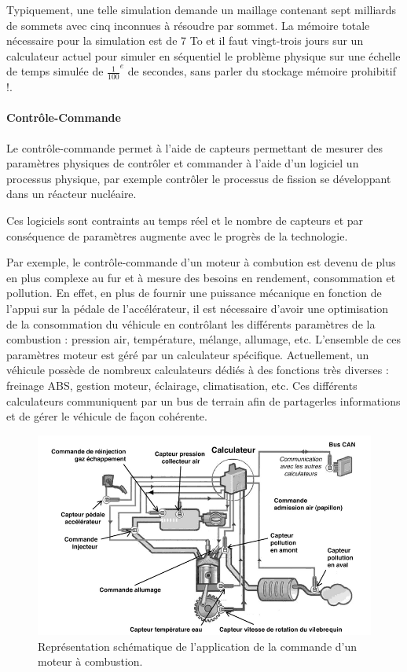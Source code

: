 \documentclass[fleqn,11pt]{article}
\begin{document}
Typiquement, une telle simulation demande un maillage contenant sept milliards de sommets avec cinq inconnues à résoudre par sommet. La mémoire totale nécessaire pour la simulation est de 7 To et il faut vingt-trois jours sur un calculateur actuel pour simuler en séquentiel le problème physique sur une échelle de temps simulée de ${\frac{1}{100}}^{e}$ de secondes, sans parler du stockage mémoire prohibitif !.

\paragraph{Contrôle-Commande}

Le contrôle-commande permet à l'aide de capteurs permettant de mesurer des paramètres physiques de contrôler et commander à l'aide d'un logiciel un processus physique, par exemple contrôler le processus de fission se développant dans un réacteur nucléaire. 

Ces logiciels sont contraints au temps réel et le nombre de capteurs et par conséquence de paramètres augmente avec le progrès de la technologie.

Par exemple, le contrôle-commande d'un moteur à combution est devenu de plus en plus complexe au fur et à mesure des besoins en rendement, consommation et pollution. En effet, en plus de fournir une puissance mécanique en fonction de l'appui sur la pédale de l'accélérateur,  il est nécessaire d'avoir une optimisation de la consommation du véhicule en contrôlant les différents paramètres de la combustion : pression air, température, mélange,  allumage, etc. L'ensemble de ces paramètres moteur est géré par un calculateur spécifique. Actuellement,  un véhicule possède de nombreux calculateurs dédiés à des fonctions très diverses : freinage ABS, gestion moteur, éclairage,  climatisation, etc. Ces différents calculateurs communiquent par un bus de terrain afin de partagerles informations et de gérer le véhicule de façon cohérente.

\begin{figure}[h]
\includegraphics[width=\textwidth]{ControleCommande}
\caption{Représentation schématique de l'application de la commande d'un moteur à combustion.}
\end{figure}
\end{document}
